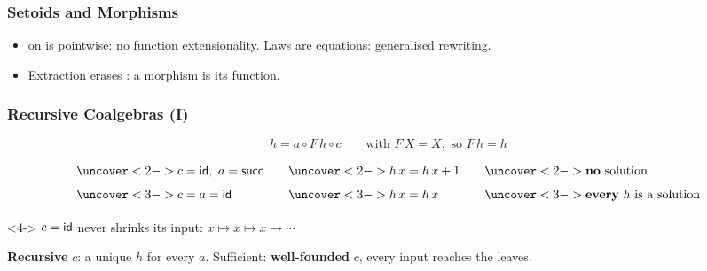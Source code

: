 \begin{frame*}[vertical-alignment = top]
  \frametitle{Setoids and Morphisms}
  \vspace*{2mm}
  \simplified
  \begin{itemize}
    \item {} on  is pointwise: no
      function extensionality. Laws are  equations: generalised
      rewriting.
    \item Extraction erases : a morphism is its function.
  \end{itemize}
\end{frame*}

\begin{frame}
  \frametitle{Recursive Coalgebras (I)}
  \[ h = a \circ F\,h \circ c \qquad \text{with } F\,X = X,
     \text{ so } F\,h = h \]
  \[
    \renewcommand\arraystretch{1.6}
    \begin{array}{l@{\qquad}l@{\qquad}l}
      \uncover<2->{c = \op{id},\ a = \op{succ}} &
        \uncover<2->{h\,x = h\,x + 1} &
        \uncover<2->{\text{\textbf{no} solution}} \\
      \uncover<3->{c = a = \op{id}} &
        \uncover<3->{h\,x = h\,x} &
        \uncover<3->{\text{\textbf{every} $h$ is a solution}}
    \end{array}
  \]
  \begin{uncoverenv}<4->
    $c = \mathsf{id}$ never shrinks its input: $x \mapsto x \mapsto x \mapsto
    \cdots$

    \textbf{Recursive} $c$: a unique $h$ for every $a$. Sufficient:
    \textbf{well-founded} $c$, every input reaches the leaves.
  \end{uncoverenv}
\end{frame}

